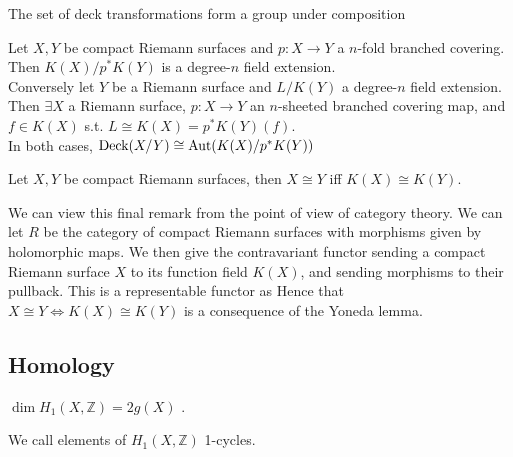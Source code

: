 \documentclass{article}
\begin{document}
\begin{prop}
	The set of deck transformations form a group under composition
\end{prop}

\begin{theorem}
	Let $X,Y$ be compact Riemann surfaces and $p:X \to Y$ a $n$-fold branched covering. Then $K(X)/p^\ast K(Y)$ is a degree-$n$ field extension. \\
	Conversely let $Y$ be a Riemann surface and $L/K(Y)$ a degree-$n$ field extension. Then $\exists X$ a Riemann surface, $p:X \to Y$ an $n$-sheeted branched covering map, and $f \in K(X)$ s.t. $L\cong K(X)=p^\ast K(Y)(f)$. \\
	In both cases, $\text{Deck}(X/Y) \cong \operatorname{Aut}(K(X) / p^\ast K(Y))$  
\end{theorem}

\begin{corollary}
	Let $X,Y$ be compact Riemann surfaces, then $X\cong Y$ iff $K(X) \cong K(Y)$. 
\end{corollary}

\begin{remark}
	We can view this final remark from the point of view of category theory. We can let $R$ be the category of compact Riemann surfaces with morphisms given by holomorphic maps. We then give the contravariant functor 
	sending a compact Riemann surface $X$ to its function field $K(X)$, and sending morphisms to their pullback. This is a representable functor as 
	Hence that $X \cong Y \Leftrightarrow K(X) \cong K(Y)$ is a consequence of the Yoneda lemma. 
\end{remark}

\subsection{Homology}
\begin{lemma}
	$\dim H_1(X, \mathbb{Z}) = 2g(X)$ . 
\end{lemma}

\begin{definition}
	We call elements of $H_1(X, \mathbb{Z})$ 1-cycles. 
\end{definition}
\end{document}

